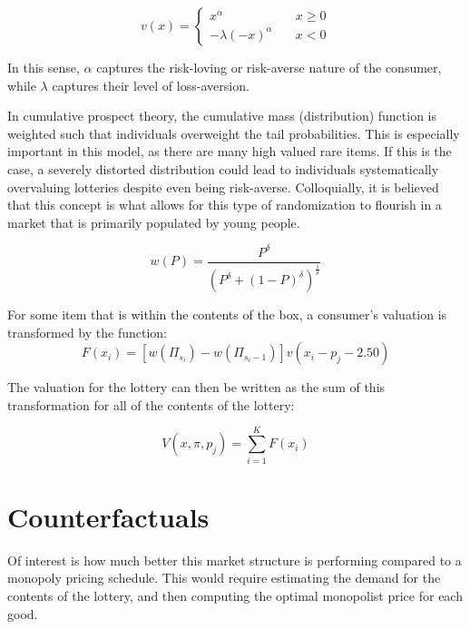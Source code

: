 \documentclass[12pt]{paper}
\newcommand{\brak}[1]{ \left [ #1 \right ] }
\begin{document}
\begin{equation*}
  v(x) =
  \begin{cases}
    x^\alpha \quad &x \geq 0\\
    -\lambda(-x)^\alpha \quad &x < 0
  \end{cases}
\end{equation*}

In this sense, $\alpha$ captures the risk-loving or risk-averse nature of
the consumer, while $\lambda$ captures their level of loss-aversion.


In cumulative prospect theory, the cumulative mass (distribution)
function is weighted such that individuals overweight the tail
probabilities. This is especially important in this model, as there are
many high valued rare items. If this is the case, a severely distorted
distribution could lead to individuals systematically overvaluing
lotteries despite even being risk-averse. Colloquially, it is believed
that this concept is what allows for this type of randomization to
flourish in a market that is primarily populated by young people.

\begin{equation*}
  w(P) = \frac{ P^\delta }{( P^\delta + (1-P)^\delta )^{\frac{1}{\delta}}}
\end{equation*}

For some item that is within the contents of the box, a consumer's
valuation is transformed by the function:
\begin{equation*}
F(x_i) = \brak{w( \Pi_{s_i}) - w(\Pi_{s_i - 1}) } v( x_i - p_j - 2.50)
\end{equation*}

The valuation for the lottery can then be written as the sum of this
transformation for all of the contents of the lottery:

\begin{equation*}
  V(x,\pi,p_j) = \sum_{i=1}^K F( x_i)
\end{equation*}


\section{Counterfactuals}

Of interest is how much better this market structure is performing
compared to a monopoly pricing schedule. This would require estimating
the demand for the contents of the lottery, and then computing the
optimal monopolist price for each good. 
\end{document}

